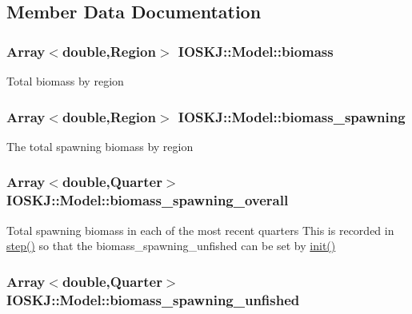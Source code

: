 \subsection{Member Data Documentation}
\hypertarget{classIOSKJ_1_1Model_a05da71e81b1a0a7ecbba4d417f4ba727}{
\subsubsection[{biomass}]{\setlength{\rightskip}{0pt plus 5cm}Array$<$double,Region$>$ I\-O\-S\-K\-J\-::\-Model\-::biomass}}\label{classIOSKJ_1_1Model_a05da71e81b1a0a7ecbba4d417f4ba727}
Total biomass by region \hypertarget{classIOSKJ_1_1Model_ac507a33d868bbf1b74a6e098f32eb49f}{
\subsubsection[{biomass\-\_\-spawning}]{\setlength{\rightskip}{0pt plus 5cm}Array$<$double,Region$>$ I\-O\-S\-K\-J\-::\-Model\-::biomass\-\_\-spawning}}\label{classIOSKJ_1_1Model_ac507a33d868bbf1b74a6e098f32eb49f}
The total spawning biomass by region \hypertarget{classIOSKJ_1_1Model_a2e2376de2347bb24f9cd18c6cb6b71a5}{
\subsubsection[{biomass\-\_\-spawning\-\_\-overall}]{\setlength{\rightskip}{0pt plus 5cm}Array$<$double,Quarter$>$ I\-O\-S\-K\-J\-::\-Model\-::biomass\-\_\-spawning\-\_\-overall}}\label{classIOSKJ_1_1Model_a2e2376de2347bb24f9cd18c6cb6b71a5}
Total spawning biomass in each of the most recent quarters This is recorded in \hyperlink{classIOSKJ_1_1Model_af163ebda22001c7df308dc227c1687bb}{step()} so that the biomass\-\_\-spawning\-\_\-unfished can be set by \hyperlink{classIOSKJ_1_1Model_af64274ff5991d11e1c232618af8de800}{init()} \hypertarget{classIOSKJ_1_1Model_a2fe8d9737c54dcba326f0d6d73e50d28}{
\subsubsection[{biomass\-\_\-spawning\-\_\-unfished}]{\setlength{\rightskip}{0pt plus 5cm}Array$<$double,Quarter$>$ I\-O\-S\-K\-J\-::\-Model\-::biomass\-\_\-spawning\-\_\-unfished}}\label{classIOSKJ_1_1Model_a2fe8d9737c54dcba326f0d6d73e50d28}
